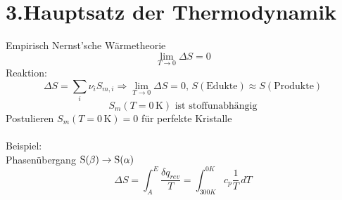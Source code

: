 \documentclass[a4paper, fleqn]{article}
\begin{document}
\section{3.Hauptsatz der Thermodynamik}
Empirisch Nernst'sche Wärmetheorie
\begin{equation*}
    \lim_{T\rightarrow 0} \Delta S = 0
\end{equation*}
Reaktion:
\begin{equation*}
    \Delta S = \sum_{i} \nu_i S_{m,i} \Rightarrow \lim_{T\rightarrow 0} \Delta S = 0,\, S(\mathrm{Edukte}) \approx S(\mathrm{Produkte})
\end{equation*}
\begin{equation*}
    S_m (T=0\,\mathrm{K}) \text{ ist stoffunabhängig}
\end{equation*}
Postulieren $S_m (T=0\,\mathrm{K})=0$ für perfekte Kristalle\\\\
Beispiel:\\
Phasenübergang $\ce{S}(\beta) \rightarrow \ce{S}(\alpha)$\\
\begin{equation*}
    \Delta S = \int^{E}_{A} \frac{\delta q_{rev}}{T}=\int_{300K}^{0K}c_p\frac{1}{T}\,dT
\end{equation*}
\end{document}
